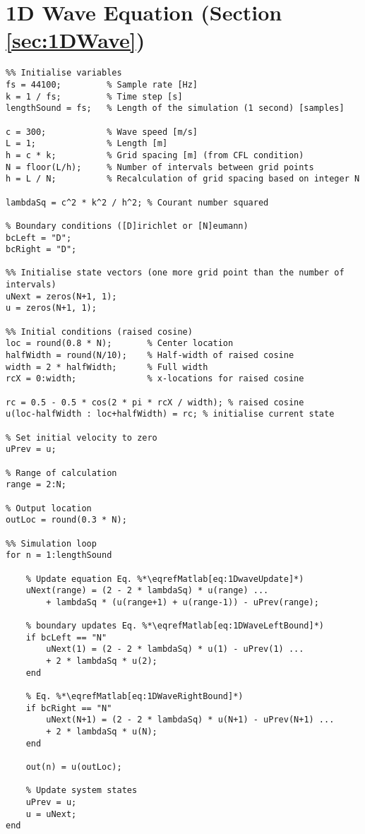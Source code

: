 \section{1D Wave Equation (Section \ref{sec:1DWave})}
\label{app:1DWave}
\begin{lstlisting}
%% Initialise variables
fs = 44100;         % Sample rate [Hz]
k = 1 / fs;         % Time step [s]
lengthSound = fs;   % Length of the simulation (1 second) [samples]             

c = 300;            % Wave speed [m/s]
L = 1;              % Length [m]
h = c * k;          % Grid spacing [m] (from CFL condition)
N = floor(L/h);     % Number of intervals between grid points
h = L / N;          % Recalculation of grid spacing based on integer N

lambdaSq = c^2 * k^2 / h^2; % Courant number squared

% Boundary conditions ([D]irichlet or [N]eumann)
bcLeft = "D";            
bcRight = "D"; 

%% Initialise state vectors (one more grid point than the number of intervals)
uNext = zeros(N+1, 1); 
u = zeros(N+1, 1);

%% Initial conditions (raised cosine)
loc = round(0.8 * N);       % Center location
halfWidth = round(N/10);    % Half-width of raised cosine
width = 2 * halfWidth;      % Full width
rcX = 0:width;              % x-locations for raised cosine

rc = 0.5 - 0.5 * cos(2 * pi * rcX / width); % raised cosine
u(loc-halfWidth : loc+halfWidth) = rc; % initialise current state  

% Set initial velocity to zero
uPrev = u;

% Range of calculation 
range = 2:N;

% Output location
outLoc = round(0.3 * N);

%% Simulation loop
for n = 1:lengthSound
    
    % Update equation Eq. %*\eqrefMatlab[eq:1DwaveUpdate]*)
    uNext(range) = (2 - 2 * lambdaSq) * u(range) ...
        + lambdaSq * (u(range+1) + u(range-1)) - uPrev(range); 
    
    % boundary updates Eq. %*\eqrefMatlab[eq:1DWaveLeftBound]*)
    if bcLeft == "N"
        uNext(1) = (2 - 2 * lambdaSq) * u(1) - uPrev(1) ...
        + 2 * lambdaSq * u(2); 
    end

    % Eq. %*\eqrefMatlab[eq:1DWaveRightBound]*)
    if bcRight == "N"
        uNext(N+1) = (2 - 2 * lambdaSq) * u(N+1) - uPrev(N+1) ...
        + 2 * lambdaSq * u(N); 
    end
    
    out(n) = u(outLoc);
    
    % Update system states
    uPrev = u;
    u = uNext;
end
\end{lstlisting}
